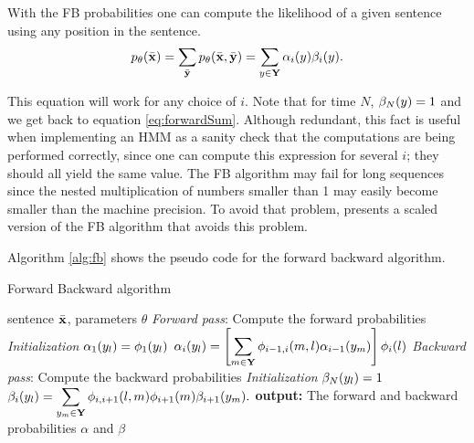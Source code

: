 With the FB probabilities one can compute the likelihood of a given sentence using any position in the sentence.
\begin{equation}
\label{eq::fbsanity}
  p_{\theta}(\bar{\mathbf{x}}) = \displaystyle \sum_{\bar{\mathbf{y}}} p_{\theta}(\bar{\mathbf{x}} ,\bar{\mathbf{y}}) = 
  \displaystyle \sum_{{y} \in \mathbf{Y}} \alpha_i({y}) \beta_i({y}).
\end{equation}

This equation will work for any choice of $i$. Note that for time $N$, $\beta_N({y}) = 1$ and we get back to equation
\ref{eq:forwardSum}. Although redundant, this fact is useful when implementing an
HMM as a sanity check that the computations are being performed
correctly, since one can compute this expression for several $i$; they should all yield the same value. The FB algorithm may fail for long
sequences since the nested multiplication of numbers smaller than 1
may easily become smaller than the machine precision. To avoid that
problem, \cite{rabiner} presents a scaled version of the FB algorithm that avoids this problem.

Algorithm \ref{alg:fb} shows the pseudo code for the forward backward algorithm.

\begin{algorithm}[t]
   \caption{Forward Backward algorithm \label{alg:fb}}
\begin{algorithmic}[1]
    sentence $\bar{\mathbf{x}}$, parameters $\theta$
        \STATE  \emph{Forward pass}: Compute the forward probabilities
        \STATE \emph{Initialization}
        \STATE $\alpha_1({y}_l) = \phi_1({y}_l)$
        \ENDFOR 
                 \STATE $\alpha_i({y}_l) = \left[ \displaystyle
                   \sum_{m  \in \mathbf{Y}} \phi_{i-1,i}(m,l)
                   \alpha_{i-1}({y}_m) \right] \phi_i(l)$
         \ENDFOR 
        \ENDFOR 
       \STATE \emph{Backward pass}: Compute the backward probabilities
       \STATE \emph{Initialization}
        \STATE $\beta_N({y}_l) = 1$
        \ENDFOR 
        \STATE $\beta_i({y}_l) = \displaystyle \sum_{{y}_m \in \mathbf{Y}} \phi_{i,i+1}(l,m)\phi_{i+1}(m) \beta_{i+1}({y}_m).$
        \ENDFOR 
       \STATE \textbf{output:} The forward and backward probabilities
       $\alpha$ and $\beta$
\end{algorithmic}
\end{algorithm}



